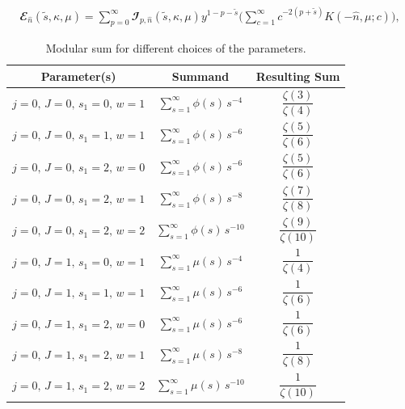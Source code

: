 \documentclass[12 pt]{article}
\begin{document}
    \begin{align}
     \mathbfcal{E}_{\hat n}(\tilde s,\kappa,\mu)=\sum_{p=0}^\infty \mathbfcal{I}_{p,\hat n}(\tilde s,\kappa,\mu)y^{1-p-\tilde s}{\Bigg(\sum_{c=1}^\infty c^{-2(p+ \tilde s)}K(-\hat n,\mu;c)}\Bigg),\label{3.8u}
 \end{align}
 
\begin{table}[htb!]
\centering
{}
\begin{tabular}{|c|c|c|}
\hline
\textbf{Parameter(s)} & \textbf{Summand} & \textbf{Resulting Sum} \\
\hline
$j=0,\,J=0,\,s_1=0,\,w=1$ & $\sum_{s=1}^{\infty}\phi(s)\,s^{-4}$  & $\dfrac{\zeta(3)}{\zeta(4)}$ \\[6pt]
$j=0,\,J=0,\,s_1=1,\,w=1$ & $\sum_{s=1}^{\infty}\phi(s)\,s^{-6}$  & $\dfrac{\zeta(5)}{\zeta(6)}$ \\[6pt]
$j=0,\,J=0,\,s_1=2,\,w=0$ & $\sum_{s=1}^{\infty}\phi(s)\,s^{-6}$  & $\dfrac{\zeta(5)}{\zeta(6)}$ \\[6pt]
$j=0,\,J=0,\,s_1=2,\,w=1$ & $\sum_{s=1}^{\infty}\phi(s)\,s^{-8}$  & $\dfrac{\zeta(7)}{\zeta(8)}$ \\[6pt]
$j=0,\,J=0,\,s_1=2,\,w=2$ & $\sum_{s=1}^{\infty}\phi(s)\,s^{-10}$ & $\dfrac{\zeta(9)}{\zeta(10)}$ \\[6pt]
$j=0,\,J=1,\,s_1=0,\,w=1$ & $\sum_{s=1}^{\infty}\mu(s)\,s^{-4}$  & $\dfrac{1}{\zeta(4)}$ \\[6pt]
$j=0,\,J=1,\,s_1=1,\,w=1$ & $\sum_{s=1}^{\infty}\mu(s)\,s^{-6}$  & $\dfrac{1}{\zeta(6)}$ \\[6pt]
$j=0,\,J=1,\,s_1=2,\,w=0$ & $\sum_{s=1}^{\infty}\mu(s)\,s^{-6}$  & $\dfrac{1}{\zeta(6)}$ \\[6pt]
$j=0,\,J=1,\,s_1=2,\,w=1$ & $\sum_{s=1}^{\infty}\mu(s)\,s^{-8}$  & $\dfrac{1}{\zeta(8)}$ \\[6pt]
$j=0,\,J=1,\,s_1=2,\,w=2$ & $\sum_{s=1}^{\infty}\mu(s)\,s^{-10}$ & $\dfrac{1}{\zeta(10)}$ \\[6pt]
\hline
\end{tabular}
\caption{Modular sum for different choices of the parameters.}
\label{Tab3}
\end{table}
\end{document}
